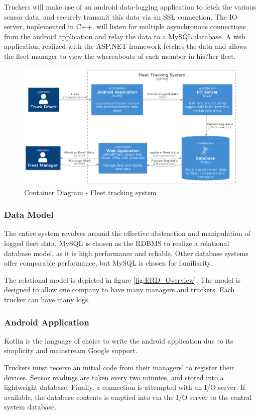 Truckers will make use of an android data-logging application to fetch the various sensor data, and securely transmit this data via an SSL connection.
The IO server, implemented in C++, will listen for multiple asynchronous connections from the android application and relay the data to a MySQL database.
A web application, realized with the ASP.NET framework fetches the data and allows the fleet manager to view the whereabouts of each member in his/her fleet.
\begin{figure}[H]
\centering
\includegraphics[width=6in]{container.png}
\caption{Container Diagram - Fleet tracking system}
\label{fig:container}
\end{figure}

\subsubsection{Data Model}
The entire system revolves around the effective abstraction and manipulation of logged fleet data.
MySQL is chosen as the RDBMS to realize a relational database model, as it is high performance and reliable.
Other database systems offer comparable performance, but MySQL is chosen for familiarity.

The relational model is depicted in figure \ref{fig:ERD_Overview}.
The model is designed to allow one company to have many managers and truckers. Each trucker can have many logs.

\subsubsection{Android Application}
Kotlin is the language of choice to write the android application due to its simplicity and mainstream Google support.

Truckers must receive an initial code from their managers' to register their devices.
Sensor readings are taken every two minutes, and stored into a lightweight database.
Finally, a connection is attempted with an I/O server. If available, the database contents is emptied into via the I/O server to the central system database.

